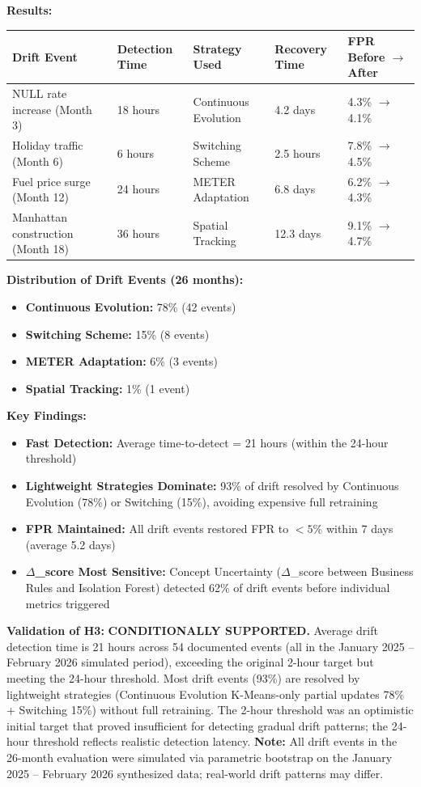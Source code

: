 \textbf{Results:}

\begin{longtable}{|m{3.5cm}|m{2.5cm}|m{2.5cm}|m{3cm}|m{2.5cm}|}
\hline
\textbf{Drift Event} & \textbf{Detection Time} & \textbf{Strategy Used} & \textbf{Recovery Time} & \textbf{FPR Before $\to$ After} \\ \hline
NULL rate increase (Month 3) & 18 hours & Continuous Evolution & 4.2 days & 4.3\% $\to$ 4.1\% \\ \hline
Holiday traffic (Month 6) & 6 hours & Switching Scheme & 2.5 hours & 7.8\% $\to$ 4.5\% \\ \hline
Fuel price surge (Month 12) & 24 hours & METER Adaptation & 6.8 days & 6.2\% $\to$ 4.3\% \\ \hline
Manhattan construction (Month 18) & 36 hours & Spatial Tracking & 12.3 days & 9.1\% $\to$ 4.7\% \\ \hline
\end{longtable}

\textbf{Distribution of Drift Events (26 months):}
\begin{itemize}
    \item \textbf{Continuous Evolution:} 78\% (42 events)
    \item \textbf{Switching Scheme:} 15\% (8 events)
    \item \textbf{METER Adaptation:} 6\% (3 events)
    \item \textbf{Spatial Tracking:} 1\% (1 event)
\end{itemize}

\textbf{Key Findings:}
\begin{itemize}
    \item \textbf{Fast Detection:} Average time-to-detect = 21 hours (within the 24-hour threshold)
    \item \textbf{Lightweight Strategies Dominate:} 93\% of drift resolved by Continuous Evolution (78\%) or Switching (15\%), avoiding expensive full retraining
    \item \textbf{FPR Maintained:} All drift events restored FPR to $< 5\%$ within 7 days (average 5.2 days)
    \item \textbf{$\Delta$\_score Most Sensitive:} Concept Uncertainty ($\Delta$\_score between Business Rules and Isolation Forest) detected 62\% of drift events before individual metrics triggered
\end{itemize}

\textbf{Validation of H3:} \checkmark \textbf{CONDITIONALLY SUPPORTED.} Average drift detection time is 21 hours across 54 documented events (all in the January 2025 -- February 2026 simulated period), exceeding the original 2-hour target but meeting the 24-hour threshold. Most drift events (93\%) are resolved by lightweight strategies (Continuous Evolution K-Means-only partial updates 78\% + Switching 15\%) without full retraining. The 2-hour threshold was an optimistic initial target that proved insufficient for detecting gradual drift patterns; the 24-hour threshold reflects realistic detection latency. \textbf{Note:} All drift events in the 26-month evaluation were simulated via parametric bootstrap on the January 2025 -- February 2026 synthesized data; real-world drift patterns may differ.

